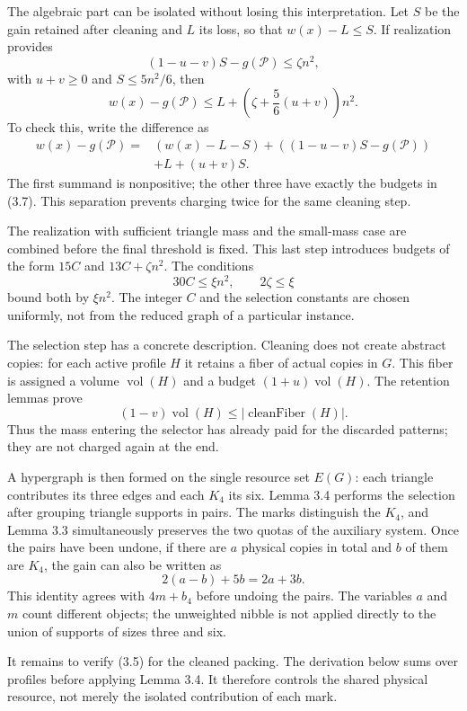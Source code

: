 \documentclass[english,11pt,a4paper]{article}
\begin{document}
The algebraic part can be isolated without losing this interpretation. Let \(S\) be the gain retained after cleaning and \(L\) its loss, so that \(w(x)-L\le S\). If realization provides \[
(1-u-v)S-g(\mathcal P)\le\zeta n^2,
\] with \(u+v\ge0\) and \(S\le5n^2/6\), then \[
w(x)-g(\mathcal P)
\le L+\left(\zeta+\frac56(u+v)\right)n^2.
\tag{3.7}
\] To check this, write the difference as \[
\begin{aligned}
w(x)-g(\mathcal P)
={}&(w(x)-L-S)+((1-u-v)S-g(\mathcal P))\\
&+L+(u+v)S.
\end{aligned}
\] The first summand is nonpositive; the other three have exactly the budgets in (3.7). This separation prevents charging twice for the same cleaning step.

The realization with sufficient triangle mass and the small-mass case are combined before the final threshold is fixed. This last step introduces budgets of the form \(15C\) and \(13C+\zeta n^2\). The conditions \[
30C\le\xi n^2,\qquad 2\zeta\le\xi
\] bound both by \(\xi n^2\). The integer \(C\) and the selection constants are chosen uniformly, not from the reduced graph of a particular instance.

The selection step has a concrete description. Cleaning does not create abstract copies: for each active profile \(H\) it retains a fiber of actual copies in \(G\). This fiber is assigned a volume \(\operatorname{vol}(H)\) and a budget \((1+u)\operatorname{vol}(H)\). The retention lemmas prove \[
(1-v)\operatorname{vol}(H)
\le |\operatorname{cleanFiber}(H)|.
\tag{3.8}
\] Thus the mass entering the selector has already paid for the discarded patterns; they are not charged again at the end.

A hypergraph is then formed on the single resource set \(E(G)\): each triangle contributes its three edges and each \(K_4\) its six. Lemma 3.4 performs the selection after grouping triangle supports in pairs. The marks distinguish the \(K_4\), and Lemma 3.3 simultaneously preserves the two quotas of the auxiliary system. Once the pairs have been undone, if there are \(a\) physical copies in total and \(b\) of them are \(K_4\), the gain can also be written as \[
2(a-b)+5b=2a+3b.
\tag{3.9}
\] This identity agrees with \(4m+b_4\) before undoing the pairs. The variables \(a\) and \(m\) count different objects; the unweighted nibble is not applied directly to the union of supports of sizes three and six.

It remains to verify (3.5) for the cleaned packing. The derivation below sums over profiles before applying Lemma 3.4. It therefore controls the shared physical resource, not merely the isolated contribution of each mark.
\end{document}
